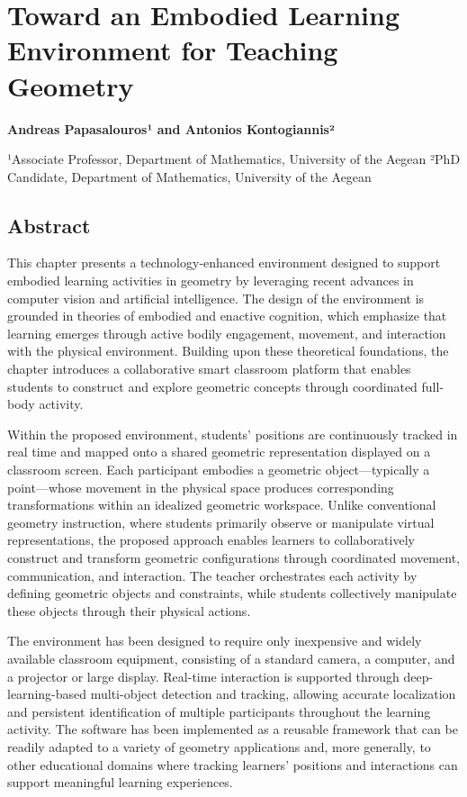 \section{Toward an Embodied Learning Environment for Teaching
Geometry}\label{toward-an-embodied-learning-environment-for-teaching-geometry}

\textbf{Andreas Papasalouros¹ and Antonios Kontogiannis²}

¹Associate Professor, Department of Mathematics, University of the
Aegean ²PhD Candidate, Department of Mathematics, University of the
Aegean

\subsection{Abstract}\label{abstract}

This chapter presents a technology-enhanced environment designed to
support embodied learning activities in geometry by leveraging recent
advances in computer vision and artificial intelligence. The design of
the environment is grounded in theories of embodied and enactive
cognition, which emphasize that learning emerges through active bodily
engagement, movement, and interaction with the physical environment.
Building upon these theoretical foundations, the chapter introduces a
collaborative smart classroom platform that enables students to
construct and explore geometric concepts through coordinated full-body
activity.

Within the proposed environment, students' positions are continuously
tracked in real time and mapped onto a shared geometric representation
displayed on a classroom screen. Each participant embodies a geometric
object---typically a point---whose movement in the physical space
produces corresponding transformations within an idealized geometric
workspace. Unlike conventional geometry instruction, where students
primarily observe or manipulate virtual representations, the proposed
approach enables learners to collaboratively construct and transform
geometric configurations through coordinated movement, communication,
and interaction. The teacher orchestrates each activity by defining
geometric objects and constraints, while students collectively
manipulate these objects through their physical actions.

The environment has been designed to require only inexpensive and widely
available classroom equipment, consisting of a standard camera, a
computer, and a projector or large display. Real-time interaction is
supported through deep-learning-based multi-object detection and
tracking, allowing accurate localization and persistent identification
of multiple participants throughout the learning activity. The software
has been implemented as a reusable framework that can be readily adapted
to a variety of geometry applications and, more generally, to other
educational domains where tracking learners' positions and interactions
can support meaningful learning experiences.

